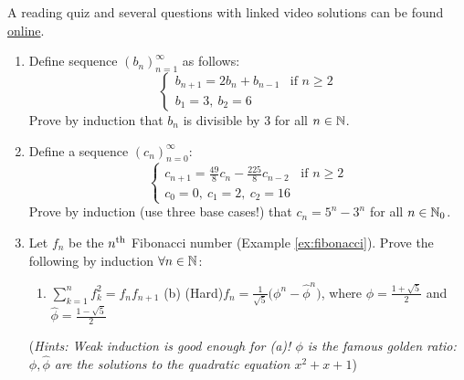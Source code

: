 \begin{exercises}{}{}
	A reading quiz and several questions with linked video solutions can be found \href{http://www.math.uci.edu/~ndonalds/math13/selftest/5-3-strongind.html}{online}.

	\begin{enumerate}  
  	\item Define sequence $(b_n)_{n=1}^\infty$ as follows:
  	\[
  		\begin{cases}
				b_{n+1}=2b_n+b_{n-1} &\text{if } n\ge 2\\
				b_1=3, \ b_2=6
			\end{cases}
		\]
		Prove by induction that $b_n$ is divisible by 3 for all $n\in\mathbb{N}$.
	
	
		\item\label{ex:ind3strong} Define a sequence $(c_n)_{n=0}^\infty$:
	 	\[
	 		\begin{cases}
				c_{n+1}=\frac{49}8c_n-\frac{225}8c_{n-2}&\text{if }n\ge 2\\
				c_0=0, \ c_1=2, \ c_2=16
			\end{cases}
		\]
		Prove by induction (use three base cases!) that $c_n=5^n-3^n$ for all $n\in\mathbb{N}_0$.
		
		
		\item\label{exs:fib} Let $f_n$ be the $n\textsuperscript{th}$ Fibonacci number (Example \ref{ex:fibonacci}). Prove the following by induction $\forall n\in\mathbb{N}$:
		\begin{enumerate}
		  \item $\sum\limits_{k=1}^nf_k^2=f_nf_{n+1}$ \qquad\qquad (b) (Hard)\lstsp $f_n=\frac 1{\sqrt 5}\bigl(\phi^n-\hat\phi^n\bigr)$, where $\phi=\frac{1+\sqrt{5}}2$ and $\hat\phi=\frac{1-\sqrt{5}}2$
		\end{enumerate}
		(\emph{Hints: Weak induction is good enough for (a)! $\phi$ is the famous \emph{golden ratio}: $\phi,\hat\phi$ are the solutions to the quadratic equation $x^2+x+1$})
	
	
		\goodbreak
  
%   
	
	
		

\end{enumerate}
\end{exercises}

